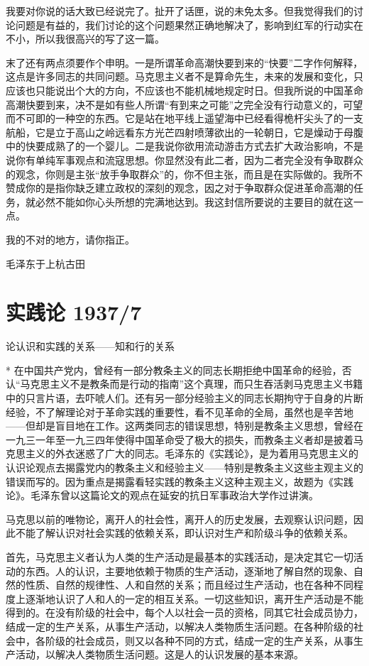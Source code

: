 \documentclass[UTF8, 12pt, a4paper]{ctexrep}
\begin{document}
我要对你说的话大致已经说完了。扯开了话匣，说的未免太多。但我觉得我们的讨论问题是有益的，我们讨论的这个问题果然正确地解决了，影响到红军的行动实在不小，所以我很高兴的写了这一篇。

末了还有两点须要作个申明。一是所谓革命高潮快要到来的“快要”二字作何解释，这点是许多同志的共同问题。马克思主义者不是算命先生，未来的发展和变化，只应该也只能说出个大的方向，不应该也不能机械地规定时日。但我所说的中国革命高潮快要到来，决不是如有些人所谓“有到来之可能”之完全没有行动意义的，可望而不可即的一种空的东西。它是站在地平线上遥望海中已经看得桅杆尖头了的一支航船，它是立于高山之岭远看东方光芒四射喷薄欲出的一轮朝日，它是燥动于母腹中的快要成熟了的一个婴儿。二是我说你欲用流动游击方式去扩大政治影响，不是说你有单纯军事观点和流寇思想。你显然没有此二者，因为二者完全没有争取群众的观念，你则是主张“放手争取群众”的，你不但主张，而且是在实际做的。我所不赞成你的是指你缺乏建立政权的深刻的观念，因之对于争取群众促进革命高潮的任务，就必然不能如你心头所想的完满地达到。我这封信所要说的主要目的就在这一点。

我的不对的地方，请你指正。

毛泽东于上杭古田

\section{实践论 1937/7}

\centerline{论认识和实践的关系——知和行的关系}

* 在中国共产党内，曾经有一部分教条主义的同志长期拒绝中国革命的经验，否认“马克思主义不是教条而是行动的指南”这个真理，而只生吞活剥马克思主义书籍中的只言片语，去吓唬人们。还有另一部分经验主义的同志长期拘守于自身的片断经验，不了解理论对于革命实践的重要性，看不见革命的全局，虽然也是辛苦地——但却是盲目地在工作。这两类同志的错误思想，特别是教条主义思想，曾经在一九三一年至一九三四年使得中国革命受了极大的损失，而教条主义者却是披着马克思主义的外衣迷惑了广大的同志。毛泽东的《实践论》，是为着用马克思主义的认识论观点去揭露党内的教条主义和经验主义——特别是教条主义这些主观主义的错误而写的。因为重点是揭露看轻实践的教条主义这种主观主义，故题为《实践论》。毛泽东曾以这篇论文的观点在延安的抗日军事政治大学作过讲演。

马克思以前的唯物论，离开人的社会性，离开人的历史发展，去观察认识问题，因此不能了解认识对社会实践的依赖关系，即认识对生产和阶级斗争的依赖关系。

首先，马克思主义者认为人类的生产活动是最基本的实践活动，是决定其它一切活动的东西。人的认识，主要地依赖于物质的生产活动，逐渐地了解自然的现象、自然的性质、自然的规律性、人和自然的关系；而且经过生产活动，也在各种不同程度上逐渐地认识了人和人的一定的相互关系。一切这些知识，离开生产活动是不能得到的。在没有阶级的社会中，每个人以社会一员的资格，同其它社会成员协力，结成一定的生产关系，从事生产活动，以解决人类物质生活问题。在各种阶级的社会中，各阶级的社会成员，则又以各种不同的方式，结成一定的生产关系，从事生产活动，以解决人类物质生活问题。这是人的认识发展的基本来源。
\end{document}
